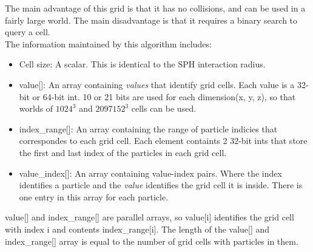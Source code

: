\documentclass[]{article}
\begin{document}
			The main advantage of this grid is that it has no collisions, and can be used in a fairly large world. 
			The main disadvantage is that it requires a binary search to query a cell.\\
			
			The information maintained by this algorithm includes:
			\begin{itemize}
				\item Cell size: A scalar. This is identical to the SPH interaction radius.
				\item value[]: An array containing \textit{values} that identify grid cells. Each value is a 32-bit or 
				64-bit int. 10 or 21 bits are used for each dimension(x, y, z), so that worlds of \(1024^3\) and 
				\(2097152^3\) cells can be used.
				\item index\_range[]: An array containing the range of particle indicies that correspondes to each grid
				cell. Each element containts 2 32-bit ints that store the first and last index of the particles in each
				grid cell.
				\item value\_index[]: An array containing value-index pairs. Where the index identifies a particle and the
				\textit{value} identifies the grid cell it is inside. There is one entry in this array for each particle.
			\end{itemize}
			
			value[] and index\_range[] are parallel arrays, so value[i] identifies the grid cell with index i and contents 
			index\_range[i]. The length of the value[] and index\_range[] array is equal to the number of grid cells with 
			particles in them.\\
			
\end{document}
